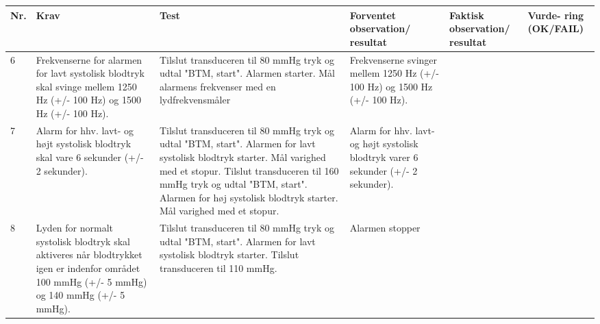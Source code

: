 \begin{table}[H]
\begin{tabular}{|p{0.5cm}|p{4cm}|p{3cm}|p{3cm}|p{3cm}|p{1cm}|}
\hline
\textbf{Nr.} & \textbf{Krav} & \textbf{Test}& \textbf{Forventet observation/ resultat}& \textbf{Faktisk observation/ resultat}& \textbf{Vurde- ring (OK/FAIL)}\\\hline
 6 & Frekvenserne for alarmen for lavt systolisk blodtryk skal svinge mellem 1250 Hz (+/- 100 Hz) og 1500 Hz (+/- 100 Hz). & Tilslut transduceren til 80 mmHg tryk og udtal "BTM, start". Alarmen starter. Mål alarmens frekvenser med en lydfrekvensmåler & Frekvenserne svinger mellem 1250 Hz (+/- 100 Hz) og 1500 Hz (+/- 100 Hz). & & \\\hline
 7 & Alarm for hhv. lavt- og højt systolisk blodtryk skal vare 6 sekunder (+/- 2 sekunder). & Tilslut transduceren til 80 mmHg tryk og udtal "BTM, start". Alarmen for lavt systolisk blodtryk starter. Mål varighed med et stopur. Tilslut transduceren til 160 mmHg tryk og udtal "BTM, start". Alarmen for høj systolisk blodtryk starter. Mål varighed med et stopur. & Alarm for hhv. lavt- og højt systolisk blodtryk varer 6 sekunder (+/- 2 sekunder). & & \\\hline
 8 & Lyden for normalt systolisk blodtryk skal aktiveres når blodtrykket igen er indenfor området 100 mmHg (+/- 5 mmHg) og 140 mmHg (+/- 5 mmHg). & Tilslut transduceren til 80 mmHg tryk og udtal "BTM, start". Alarmen for lavt systolisk blodtryk starter. Tilslut transduceren til 110 mmHg. & Alarmen stopper & & \\\hline
\end{tabular}
\end{table}
\newpage
